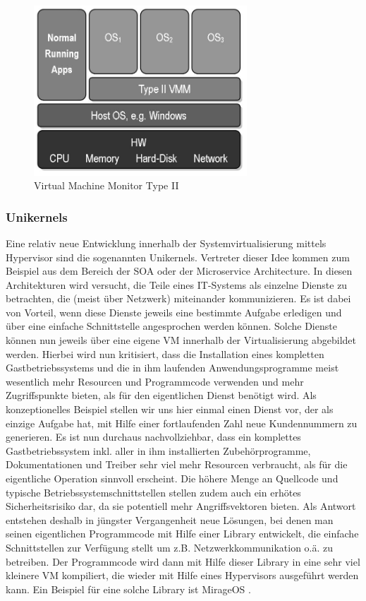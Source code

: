 \begin{figure}[!ht]
  \begin{center}
    \includegraphics[width=8cm]{bilder/VMM-Type2.jpg}
    \caption{Virtual Machine Monitor Type II \citep{wiki:003}}
  \end{center}
\end{figure}

\subsubsection{Unikernels}

Eine relativ neue Entwicklung innerhalb der Systemvirtualisierung mittels Hypervisor sind die sogenannten Unikernels. Vertreter dieser Idee kommen zum Beispiel aus dem Bereich der \ac{SOA} oder der Microservice Architecture. In diesen Architekturen wird versucht, die Teile eines IT-Systems als einzelne Dienste zu betrachten, die (meist über Netzwerk) miteinander kommunizieren. Es ist dabei von Vorteil, wenn diese Dienste jeweils eine bestimmte Aufgabe erledigen und über eine einfache Schnittstelle angesprochen werden können. Solche Dienste können nun jeweils über eine eigene \ac{VM} innerhalb der Virtualisierung abgebildet werden. Hierbei wird nun kritisiert, dass die Installation eines kompletten Gastbetriebssystems und die in ihm laufenden Anwendungsprogramme meist wesentlich mehr Resourcen und Programmcode verwenden und mehr Zugriffspunkte bieten, als für den eigentlichen Dienst benötigt wird. Als konzeptionelles Beispiel stellen wir uns hier einmal einen Dienst vor, der als einzige Aufgabe hat, mit Hilfe einer fortlaufenden Zahl neue Kundennummern zu generieren. Es ist nun durchaus nachvollziehbar, dass ein komplettes Gastbetriebssystem inkl. aller in ihm installierten Zubehörprogramme, Dokumentationen und Treiber sehr viel mehr Resourcen verbraucht, als für die eigentliche Operation sinnvoll erscheint. Die höhere Menge an Quellcode und typische Betriebssystemschnittstellen stellen zudem auch ein erhötes Sicherheitsrisiko dar, da sie potentiell mehr Angriffsvektoren bieten. Als Antwort entstehen deshalb in jüngster Vergangenheit neue Lösungen, bei denen man seinen eigentlichen Programmcode mit Hilfe einer Library entwickelt, die einfache Schnittstellen zur Verfügung stellt um z.B. Netzwerkkommunikation o.ä. zu betreiben. Der Programmcode wird dann mit Hilfe dieser Library in eine sehr viel kleinere \ac{VM} kompiliert, die wieder mit Hilfe eines Hypervisors ausgeführt werden kann. Ein Beispiel für eine solche Library ist MirageOS \citep[Vgl.][]{MadMorAnd13}.

